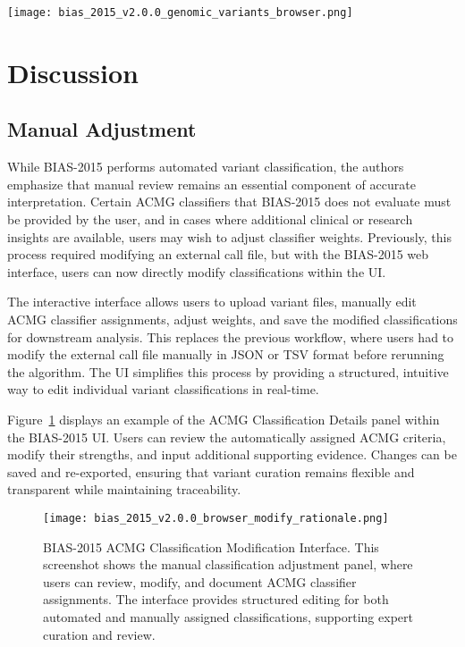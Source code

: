 \documentclass[unnumsec,webpdf,contemporary,large]{oup-authoring-template}
\theoremstyle{thmstyleone}
\theoremstyle{thmstyletwo}
\theoremstyle{thmstylethree}
\begin{document}
\begin{figure*}[!ht]
\centering
\texttt{[image: bias\_2015\_v2.0.0\_genomic\_variants\_browser.png]}
\caption{BIAS-2015 Genomic Variants Browser. This screenshot displays a subset of MYH7 variants classified by BIAS-2015, showing the ACMG classification, supporting criteria, and available actions for manual review. The interactive UI enables researchers and geneticists to efficiently manage variant curation.}
\label{fig:variant_browser}
\end{figure*}

\section{Discussion}

\subsection{Manual Adjustment}
While BIAS-2015 performs automated variant classification, the authors emphasize that manual review remains an essential component of accurate interpretation. Certain ACMG classifiers that BIAS-2015 does not evaluate must be provided by the user, and in cases where additional clinical or research insights are available, users may wish to adjust classifier weights. Previously, this process required modifying an external call file, but with the BIAS-2015 web interface, users can now directly modify classifications within the UI.

The interactive interface allows users to upload variant files, manually edit ACMG classifier assignments, adjust weights, and save the modified classifications for downstream analysis. This replaces the previous workflow, where users had to modify the external call file manually in JSON or TSV format before rerunning the algorithm. The UI simplifies this process by providing a structured, intuitive way to edit individual variant classifications in real-time.

Figure~\ref{fig:modify_acmg} displays an example of the ACMG Classification Details panel within the BIAS-2015 UI. Users can review the automatically assigned ACMG criteria, modify their strengths, and input additional supporting evidence. Changes can be saved and re-exported, ensuring that variant curation remains flexible and transparent while maintaining traceability.
\begin{figure}[!ht]
\centering
\texttt{[image: bias\_2015\_v2.0.0\_browser\_modify\_rationale.png]}
\caption{BIAS-2015 ACMG Classification Modification Interface. This screenshot shows the manual classification adjustment panel, where users can review, modify, and document ACMG classifier assignments. The interface provides structured editing for both automated and manually assigned classifications, supporting expert curation and review.}
\label{fig:modify_acmg}
\end{figure}
\end{document}

